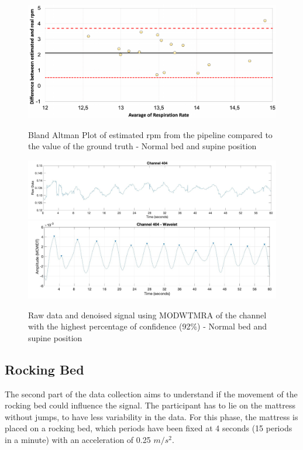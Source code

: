 \begin{figure}[p]
  \centering
  \includegraphics[width=\textwidth]{img/balnd1.pdf}

  \caption{Bland Altman Plot of estimated rpm from the pipeline compared to the value of the ground truth - Normal bed and supine position}
  \label{fig:baln1}
  \vspace{1.5cm}
  \includegraphics[width=\textwidth]{img/404.jpg}
  \includegraphics[width=\textwidth]{img/404_wave.jpg}
\caption{Raw data and denoised signal using MODWTMRA of the channel with the highest percentage of confidence (92\%) - Normal bed and supine position}
  \label{fig:rec}
\end{figure}


\clearpage
\subsection{Rocking Bed}
The second part of the data collection aims to understand if the movement of the
rocking bed could influence the signal. The participant has to lie on the mattress without jumps, to have less variability in the data. For this phase, the mattress is placed on a rocking bed, which periods have been fixed at 4 seconds (15 periods in a minute) with an acceleration of 0.25 $m/s^2$.


